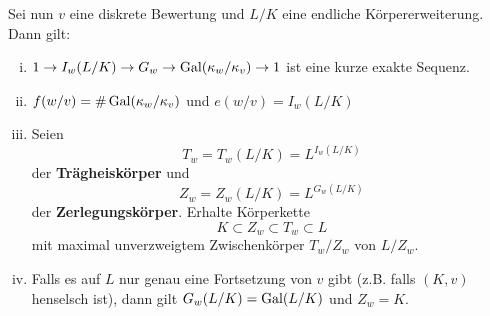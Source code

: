 \begin{Prop}
	Sei nun $v$ eine diskrete Bewertung und $L/K$ eine endliche Körpererweiterung. Dann gilt:
	\begin{enumerate}[(i)]
		\item $1\to I_w(L/K)\to G_w \to \operatorname{Gal}(\kappa_w/\kappa_v) \to 1$ ist eine kurze exakte Sequenz.
		\item $f(w/v) = \# \operatorname{Gal}(\kappa_w/\kappa_v)$ und $e(w/v) = I_w(L/K)$
		\item Seien
		\[ T_w = T_w(L/K) = L^{I_w(L/K)}
		\]
		der \textbf{Trägheiskörper} und
		\[ Z_w=Z_w(L/K) = L^{G_w(L/K)}
		\]
		der \textbf{Zerlegungskörper}. Erhalte Körperkette
		\[ K \subset Z_w \subset T_w \subset L
		\]
		mit maximal unverzweigtem Zwischenkörper $T_w/Z_w$ von $L/Z_w$.
		\item Falls es auf $L$ nur genau eine Fortsetzung von $v$ gibt (z.B. falls $(K,v)$ henselsch ist), dann gilt $G_w(L/K) = \operatorname{Gal}(L/K)$ und $Z_w =K$.
	\end{enumerate}
\end{Prop}

